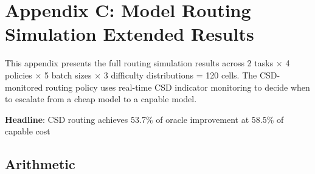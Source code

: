 \documentclass[11pt]{article}
\begin{document}
\clearpage


\section{Appendix C: Model Routing Simulation Extended Results}
\label{app:routing}

This appendix presents the full routing simulation results across
2 tasks $\times$ 4 policies $\times$ 5 batch sizes $\times$ 3 difficulty
distributions = 120 cells. The CSD-monitored routing policy uses
real-time CSD indicator monitoring to decide when to escalate from
a cheap model to a capable model.

\textbf{Headline}: CSD routing achieves 53.7\% of oracle improvement at 58.5\% of capable cost

\subsection{Arithmetic}
\end{document}
